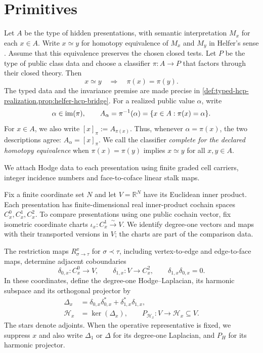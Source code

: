 \section{Primitives}\label{sec:primitives}

Let \(A\) be the type of hidden presentations, with semantic interpretation
\(M_x\) for each \(x\in A\). Write \(x\simeq y\) for homotopy equivalence
of \(M_x\) and \(M_y\) in Helfer's sense \cite[Definition~7.1]{helfer2019fol}.
Assume that this equivalence preserves the chosen closed tests. Let \(P\) be
the type of public class data and choose a classifier \(\pi:A\to P\) that factors through their
closed theory. Then
\[
  x\simeq y\quad\Longrightarrow\quad\pi(x)=\pi(y).
\]
The typed data and the invariance premise are made precise in
\cref{def:typed-hcp-realization,prop:helfer-hcp-bridge}.
For a realized public value \(\alpha\), write
\[
  \alpha\in\operatorname{im}(\pi),\qquad
  A_\alpha=\pi^{-1}(\alpha)=\{x\in A:\pi(x)=\alpha\}.
\]
For \(x\in A\), we also write
\([x]_\pi:=A_{\pi(x)}\). Thus, whenever \(\alpha=\pi(x)\), the two
descriptions agree: \(A_\alpha=[x]_\pi\). We call the classifier
\emph{complete for the declared homotopy equivalence} when
\(\pi(x)=\pi(y)\) implies \(x\simeq y\) for all \(x,y\in A\).

We attach Hodge data to each presentation using finite graded cell carriers,
integer incidence numbers and face-to-coface linear stalk maps.

Fix a finite coordinate set \(N\) and let \(V=\mathbb R^N\) have its Euclidean
inner product. Each presentation has finite-dimensional real inner-product
cochain spaces \(C_x^0,C_x^1,C_x^2\). To compare presentations using one public
cochain vector, fix isometric coordinate charts
\(\iota_x:C_x^1\overset{\sim}{\longrightarrow}V\).
We identify degree-one vectors and maps with their transported versions in
\(V\); the charts are part of the comparison data.

The restriction maps \(R^x_{\sigma\to\tau}\) for \(\sigma\prec\tau\),
including vertex-to-edge and edge-to-face maps, determine adjacent
coboundaries
\[
  \delta_{0,x}:C_x^0\to V,
  \qquad
  \delta_{1,x}:V\to C_x^2,
  \qquad
  \delta_{1,x}\delta_{0,x}=0.
\]
In these coordinates, define the degree-one Hodge--Laplacian, its harmonic
subspace and its orthogonal projector by
\[
\begin{aligned}
  \Delta_x&=\delta_{0,x}\delta_{0,x}^\ast+
    \delta_{1,x}^\ast\delta_{1,x},\\
  \mathcal H_x&=\ker(\Delta_x),\qquad
    P_{\mathcal H_x}:V\to\mathcal H_x\subseteq V.
\end{aligned}
\]
The stars denote adjoints. When the operative representative is fixed, we
suppress \(x\) and also write \(\Delta_1\) or \(\Delta\) for its degree-one
Laplacian, and \(P_H\) for its harmonic projector.

